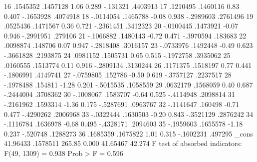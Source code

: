          16  {\VBAR}   .1545352   .1457128     1.06   0.289     -.131321    .4403913
         17  {\VBAR}   .1210495   .1460116     0.83   0.407    -.1653928    .4074918
         18  {\VBAR}  -.0114054   .1465788    -0.08   0.938    -.2989603    .2761496
         19  {\VBAR}   .0525436   .1471567     0.36   0.721    -.2361451    .3412323
         20  {\VBAR}  -.0100445   .1473921    -0.07   0.946    -.2991951     .279106
         21  {\VBAR}  -.1066882   .1480143    -0.72   0.471    -.3970594     .183683
         22  {\VBAR}   .0098874    .148706     0.07   0.947    -.2818408    .3016157
         23  {\VBAR}  -.0733976   .1492448    -0.49   0.623    -.3661828    .2193875
         24  {\VBAR}   .0981152   .1505731     0.65   0.515    -.1972758    .3935062
         25  {\VBAR}   .0160555   .1513774     0.11   0.916    -.2809134    .3130244
         26  {\VBAR}   .1171375   .1518197     0.77   0.441    -.1806991    .4149741
         27  {\VBAR}  -.0759805    .152786    -0.50   0.619    -.3757127    .2237517
         28  {\VBAR}  -.1978488    .154811    -1.28   0.201    -.5015535    .1058559
         29  {\VBAR}   .0632179   .1568059     0.40   0.687    -.2444004    .3708362
         30  {\VBAR}  -.1008067   .1583707    -0.64   0.525    -.4114948    .2098814
         31  {\VBAR}  -.2161962   .1593314    -1.36   0.175    -.5287691    .0963767
         32  {\VBAR}  -.1141647    .160498    -0.71   0.477    -.4290262    .2006968
         33  {\VBAR}  -.0322444   .1630503    -0.20   0.843    -.3521129    .2876242
         34  {\VBAR}  -.1116784   .1636978    -0.68   0.495    -.4328171    .2094603
         35  {\VBAR}  -.1959603   .1655578    -1.18   0.237     -.520748    .1288273
         36  {\VBAR}   .1685359   .1675822     1.01   0.315    -.1602231     .497295
             {\VBAR}
       _cons {\VBAR}   41.96433   .1578511   265.85   0.000     41.65467      42.274
F test of absorbed indicators: F(49, 1309) = 0.938            Prob > F = 0.596
{\smallskip}
